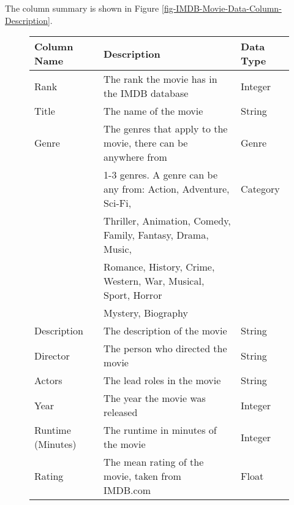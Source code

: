         The column summary is shown in Figure \ref*{fig-IMDB-Movie-Data-Column-Description}.
        \begin{figure}[h]
            \centering
            \begin{tabular}[width = \textwidth]{lll}
                \toprule
                Column Name &           Description                                                                 & Data Type \\
                \midrule
                Rank &                  The rank the movie has in the IMDB database                                 & Integer \\          
                Title &                 The name of the movie                                                       & String \\
                Genre &                 The genres that apply to the movie, there can be anywhere from              & Genre \\
                {}      &               1-3 genres. A genre can be any from: Action, Adventure, Sci-Fi,             & Category \\
                {}      &               Thriller, Animation, Comedy, Family, Fantasy, Drama, Music,                 & {} \\
                {}      &               Romance, History, Crime, Western, War, Musical, Sport, Horror               & {} \\
                {}      &               Mystery, Biography                                                          & {} \\
                Description &           The description of the movie                                                & String \\
                Director &              The person who directed the movie                                           & String \\
                Actors &                The lead roles in the movie                                                 & String \\
                Year  &                 The year the movie was released                                             & Integer \\
                Runtime (Minutes) &     The runtime in minutes of the movie                                         & Integer \\ 
                Rating   &              The mean rating of the movie, taken from IMDB.com                           & Float \\

\end{tabular}
\end{figure}
